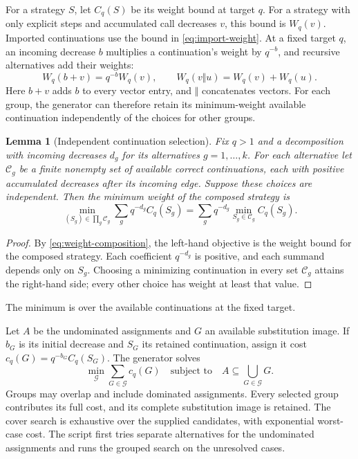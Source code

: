 \documentclass[10pt,twoside]{article}
\newtheorem{lemma}[theorem]{Lemma}
\theoremstyle{definition}
\theoremstyle{remark}
\begin{document}
For a strategy $S$, let $C_q(S)$ be its weight bound at target $q$. For a
strategy with only explicit steps and accumulated call decreases $v$, this
bound is $W_q(v)$. Imported continuations use the bound in
\cref{eq:import-weight}.
At a fixed target $q$, an incoming decrease $b$ multiplies a continuation's
weight by $q^{-b}$, and recursive alternatives add their weights:
\begin{equation}
 W_q(b+v)=q^{-b}W_q(v),\qquad
 W_q(v\Vert u)=W_q(v)+W_q(u).
 \label{eq:weight-composition}
\end{equation}
Here $b+v$ adds $b$ to every vector entry, and $\Vert$ concatenates vectors.
For each group, the generator can therefore retain its minimum-weight
available continuation independently of the choices for other groups.
\begin{lemma}[Independent continuation selection]
\label{lem:weight-selection}
Fix $q>1$ and a decomposition with incoming decreases $d_g$ for its
alternatives $g=1,\ldots,k$. For each alternative let $\mathcal C_g$ be
a finite nonempty set of available correct continuations, each with positive
accumulated decreases after its incoming edge. Suppose these choices are
independent. Then the minimum weight of the composed strategy is
\begin{equation}
 \min_{(S_g)\in\prod_g\mathcal C_g}
   \sum_g q^{-d_g}C_q(S_g)
 =\sum_g q^{-d_g}\min_{S_g\in\mathcal C_g}C_q(S_g).
 \label{eq:independent-selection}
\end{equation}
\end{lemma}
\begin{proof}
By \cref{eq:weight-composition}, the left-hand objective is the weight bound
for the composed strategy. Each coefficient $q^{-d_g}$ is positive, and
each summand depends only on $S_g$. Choosing a minimizing continuation
in every set $\mathcal C_g$ attains the right-hand side; every other
choice has weight at least that value.
\end{proof}
The minimum is over the available continuations at the fixed target.

Let $A$ be the undominated assignments and $G$ an available substitution
image. If $b_G$ is its initial decrease and $S_G$ its retained continuation,
assign it cost $c_q(G)=q^{-b_G}C_q(S_G)$. The generator solves
\begin{equation}
 \min_{\mathcal G}\sum_{G\in\mathcal G}c_q(G)
 \quad\text{subject to}\quad A\subseteq\bigcup_{G\in\mathcal G}G.
 \label{eq:group-cover}
\end{equation}
Groups may overlap and include dominated assignments. Every selected group
contributes its full cost, and its complete substitution image is retained.
The cover search is exhaustive over the supplied candidates, with exponential
worst-case cost. The script first tries separate alternatives for the
undominated assignments and runs the grouped search on the unresolved cases.
\end{document}
